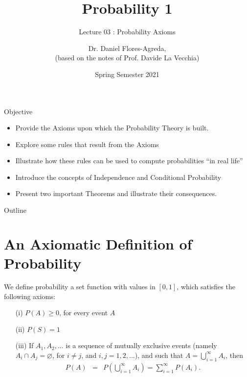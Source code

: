 \documentclass[notes=show,handout]{beamer}\usepackage[]{graphicx}\usepackage[]{color}
\newcommand{\bea}{\begin{eqnarray}}
\newcommand{\eea}{\end{eqnarray}}
\begin{document}
\title[S110015]{Probability 1}
\subtitle{Lecture 03 : Probability Axioms}
\author[Flores-Agreda, La Vecchia]{Dr. Daniel Flores-Agreda, \\[0.5em] \tiny{(based on the notes of Prof. Davide La Vecchia)}}
\date{Spring Semester 2021}

\begin{frame}
  \titlepage
\end{frame}

\begin{frame}{Objective}
  \begin{itemize}
  \item Provide the Axioms upon which the Probability Theory is built.
  \item Explore some rules that result from the Axioms
  \item Illustrate how these rules can be used to compute probabilities ``in real life''
  \item Introduce the concepts of Independence and Conditional Probability
  \item Present two important Theorems and illustrate their consequences.
  \end{itemize}
\end{frame}

\begin{frame}{Outline}
\tableofcontents
\end{frame}

\section{An Axiomatic Definition of Probability}

\begin{frame}{\secname}
  \begin{definition}
  We define probability a set function with values in $[0,1]$, which
  satisfies the following axioms:
  \begin{itemize}
  \item[ (i)] $P(A) \geq 0$, for every event $A$
  \item[ (ii)] $P(S)=1$
  \item[ (iii)] If $A_1,A_2,...$ is a sequence of mutually exclusive events (namely \color{red}$A_i \cap A_j =\varnothing$, for $i \neq j$, and $i,j=1,2,...$\color{black}),
  and such that
  $A = \bigcup_{i=1}^{\infty} A_i$, then
  \bea
  \label{Eq: additivity}
  P(A) &=& P\left(  \bigcup_{i=1}^\infty A_i \right) = \sum_{i=1}^{\infty} P(A_i).
  \eea
  \end{itemize}
  \end{definition}
\end{frame}
\end{document}
